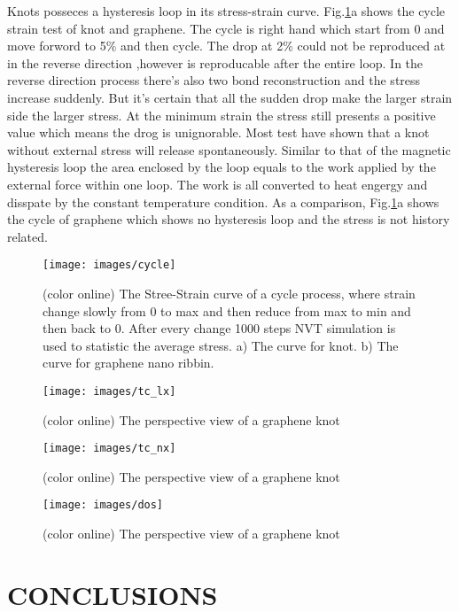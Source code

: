\documentclass[%
 reprint,
 amsmath,amssymb,
 aps,
prb,
]{revtex4-1}
\begin{document}
Knots posseces a hysteresis loop in its stress-strain curve. Fig.\ref{fig:cycle}a shows the cycle strain test of knot and graphene. The cycle is right hand which start from 0 and move forword to 5\% and then cycle. The drop at 2\% could not be reproduced at in the  reverse direction ,however is reproducable after the entire loop. In the reverse direction process there's also two bond reconstruction and the stress increase suddenly. But it's certain that all the sudden drop make the larger strain side the larger stress. At the minimum strain the stress still presents a positive value which means the drog is unignorable. Most test have shown that a knot without external stress will release spontaneously. Similar to that of the magnetic hysteresis loop the area enclosed by the loop equals to the work applied by the external force within one loop. The work is all converted to heat engergy and disspate by the constant temperature condition.
As a comparison,  Fig.\ref{fig:cycle}a shows the cycle of graphene which shows no hysteresis loop and the stress is not history related.

\begin{figure}[b]
  \texttt{[image: images/cycle]}
  \caption{\label{fig:cycle}  (color online) The Stree-Strain curve of a cycle process, where strain change slowly from 0 to max and then reduce from max to min and then back to 0. After every change 1000 steps NVT simulation is used to statistic the average stress. a) The curve for knot. b) The curve for graphene nano ribbin.}
\end{figure}



\begin{figure}[b]
  \texttt{[image: images/tc\_lx]}
  \caption{\label{fig:tc_lx}  (color online) The perspective view of a graphene knot}
\end{figure}

\begin{figure}[b]
  \texttt{[image: images/tc\_nx]}
  \caption{\label{fig:tc_nx}  (color online) The perspective view of a graphene knot}
\end{figure}

\begin{figure}[b]
  \texttt{[image: images/dos]}
  \caption{\label{fig:dos}  (color online) The perspective view of a graphene knot}
\end{figure}

\section{CONCLUSIONS}
\end{document}
